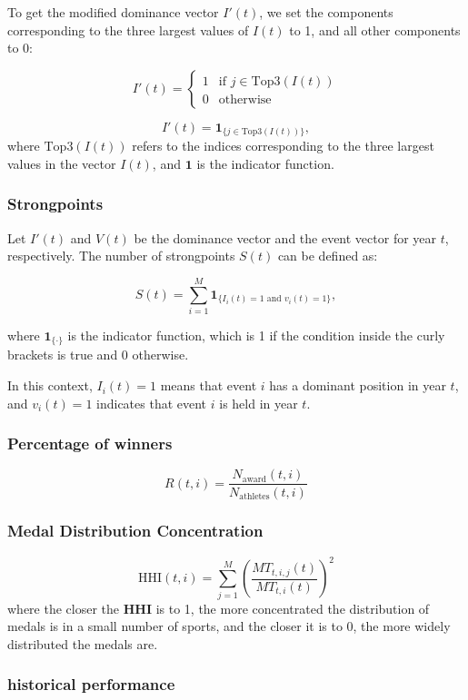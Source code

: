 \documentclass{mcmthesis}
\begin{document}
To get the modified dominance vector \( I'(t) \), we set the components corresponding to the three largest values of \( I(t) \) to 1, and all other components to 0:

\[
I'(t) = 
\begin{cases} 
	1 & \text{if } j \in \text{Top3}(I(t)) \\
	0 & \text{otherwise}
\end{cases}
\]

\[I'(t) = \mathbf{1}_{\{ j \in \text{Top3}(I(t)) \}},\]
where \( \text{Top3}(I(t)) \) refers to the indices corresponding to the three largest values in the vector \( I(t) \), and \( \mathbf{1} \) is the indicator function.

	
	\subsubsection{Strongpoints}
	
	Let \( I'(t) \) and \( V(t) \) be the dominance vector and the event vector for year \( t \), respectively. The number of strongpoints \( S(t) \) can be defined as:
	
	\[
	S(t) = \sum_{i=1}^{M} \mathbf{1}_{\{ I_i(t) = 1 \text{ and } v_i(t) = 1 \}},
	\]
	
	where \( \mathbf{1}_{\{ \cdot \}} \) is the indicator function, which is 1 if the condition inside the curly brackets is true and 0 otherwise. 
	
	In this context, \( I_i(t) = 1 \) means that event \( i \) has a dominant position in year \( t \), and \( v_i(t) = 1 \) indicates that event \( i \) is held in year \( t \).
	
	
	\subsubsection{Percentage of winners}
	\[R(t,i) = \frac{N_{\text{award}}(t,i)}{N_{\text{athletes}}(t,i)}\]
	
	\subsubsection{Medal Distribution Concentration}
\[
\text{HHI}(t,i) = \sum_{j=1}^{M} \left( \frac{MT_{t,i,j}(t)}{MT_{t,i}(t)} \right)^2
\]
where the closer the \textbf{HHI} is to 1, the more concentrated the distribution of medals is in a small number of sports, and the closer it is to 0, the more widely distributed the medals are.

	\subsubsection{historical performance}
	
\end{document}

